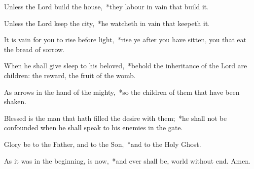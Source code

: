 \begin{enpars}
\item Unless the Lord build the house,~*they labour in vain that build it.
\item Unless the Lord keep the city,~*he watcheth in vain that keepeth it.
\item It is vain for you to rise before light,~*rise ye after you have sitten, you that eat the bread of sorrow.
\item When he shall give sleep to his beloved,~*behold the inheritance of the Lord are children: the reward, the fruit of the womb.
\item As arrows in the hand of the mighty,~*so the children of them that have been shaken.
\item  Blessed is the man that hath filled the desire with them;~*he shall not be confounded when he shall speak to his enemies in the gate.
\item Glory be to the Father, and to the Son,~*and to the Holy Ghost. 
\item As it was in the beginning, is now,~*and ever shall be, world without end. Amen.
\end{enpars}